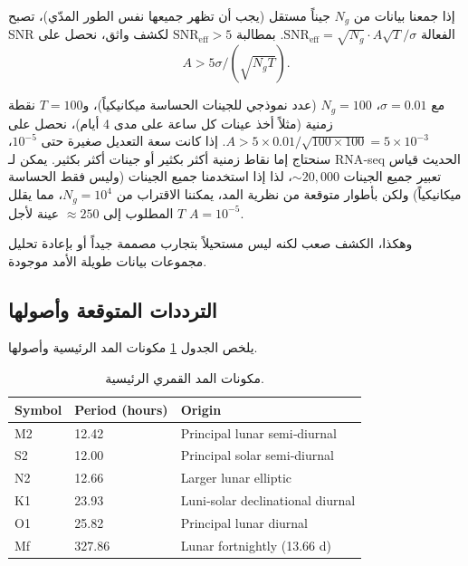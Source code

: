 \documentclass[11pt,a4paper]{article}
\theoremstyle{remark}
\begin{document}
	إذا جمعنا بيانات من \(N_g\) جيناً مستقل (يجب أن تظهر جميعها نفس الطور المدّي)، تصبح SNR الفعالة \(\mathrm{SNR}_{\text{eff}} = \sqrt{N_g} \cdot A \sqrt{T} / \sigma\). بمطالبة \(\mathrm{SNR}_{\text{eff}} > 5\) لكشف واثق، نحصل على
	\[
	A > 5 \sigma / (\sqrt{N_g T}).
	\]
	
	مع \(\sigma = 0.01\)، \(N_g = 100\) (عدد نموذجي للجينات الحساسة ميكانيكياً)، و\(T = 100\) نقطة زمنية (مثلاً أخذ عينات كل ساعة على مدى 4 أيام)، نحصل على \(A > 5\times 0.01 / \sqrt{100\times 100} = 5\times 10^{-3}\). إذا كانت سعة التعديل صغيرة حتى \(10^{-5}\)، سنحتاج إما نقاط زمنية أكثر بكثير أو جينات أكثر بكثير. يمكن لـ RNA‑seq الحديث قياس تعبير جميع الجينات \(\sim 20,000\)، لذا إذا استخدمنا جميع الجينات (وليس فقط الحساسة ميكانيكياً) ولكن بأطوار متوقعة من نظرية المد، يمكننا الاقتراب من \(N_g = 10^4\)، مما يقلل \(T\) المطلوب إلى \(\approx 250\) عينة لأجل \(A = 10^{-5}\).
	
	وهكذا، الكشف صعب لكنه ليس مستحيلاً بتجارب مصممة جيداً أو بإعادة تحليل مجموعات بيانات طويلة الأمد موجودة.
	
	\subsection{الترددات المتوقعة وأصولها}
	
	يلخص الجدول \ref{tab:tides} مكونات المد الرئيسية وأصولها.
	
	\begin{table}[htbp]
		\begin{otherlanguage}{english}
			\centering
			\caption{Principal lunar tidal constituents}
			\label{tab:tides}
			\small
			\begin{tabular}{lll}
				\toprule
				Symbol & Period (hours) & Origin \\
				\midrule
				M2 & 12.42 & Principal lunar semi‑diurnal \\
				S2 & 12.00 & Principal solar semi‑diurnal \\
				N2 & 12.66 & Larger lunar elliptic \\
				K1 & 23.93 & Luni‑solar declinational diurnal \\
				O1 & 25.82 & Principal lunar diurnal \\
				Mf & 327.86 & Lunar fortnightly (13.66 d) \\
				\bottomrule
			\end{tabular}
		\end{otherlanguage}
		\caption{مكونات المد القمري الرئيسية.}
	\end{table}
	
\end{document}
